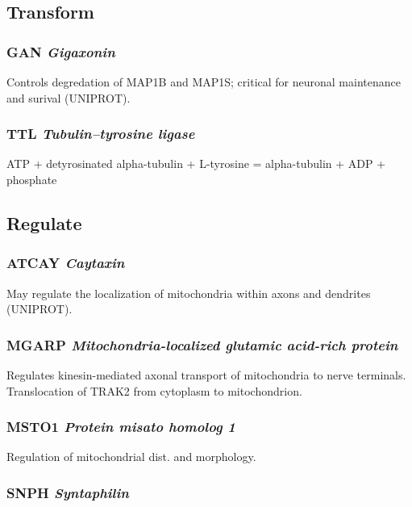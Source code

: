 \subsection{Transform}

\subsubsection{GAN \textit{Gigaxonin}}

Controls degredation of MAP1B and MAP1S; critical for neuronal maintenance and
surival (UNIPROT).

\subsubsection{TTL \textit{Tubulin--tyrosine ligase}}

ATP + detyrosinated alpha-tubulin + L-tyrosine = alpha-tubulin + ADP + phosphate

\subsection{Regulate}

\subsubsection{ATCAY \textit{Caytaxin}}

May regulate the localization of mitochondria within axons and dendrites
(UNIPROT).

\subsubsection{MGARP \textit{Mitochondria-localized glutamic acid-rich protein}}

Regulates kinesin-mediated axonal transport of mitochondria to nerve terminals.
Translocation of TRAK2 from cytoplasm to mitochondrion.

\subsubsection{MSTO1 \textit{Protein misato homolog 1}}

Regulation of mitochondrial dist. and morphology.

\subsubsection{SNPH \textit{Syntaphilin}}


